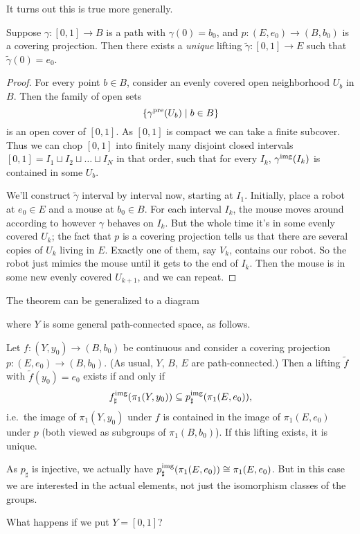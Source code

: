 It turns out this is true more generally.
\begin{theorem}
	Suppose $\gamma \colon [0,1] \to B$ is a path with $\gamma(0) = b_0$, and
	$ p \colon (E,e_0) \to (B,b_0) $
	is a covering projection.
	Then there exists a \emph{unique} lifting $\tilde\gamma \colon [0,1] \to E$
	such that $\tilde\gamma(0) = e_0$.
\end{theorem}
\begin{proof}
	For every point $b \in B$, consider an evenly covered
	open neighborhood $U_b$ in $B$.
	Then the family of open sets
	\[ \left\{ \gamma^{\text{pre}}(U_b) \mid b \in B \right\} \]
	is an open cover of $[0,1]$.
	As $[0,1]$ is compact we can take a finite subcover.
	Thus we can chop $[0,1]$ into finitely many disjoint closed intervals
	$[0,1] = I_1 \sqcup I_2 \sqcup \dots \sqcup I_N$ in that order,
	such that for every $I_k$, $\gamma^{\text{img}}(I_k)$ is contained
	in some $U_b$.

	We'll construct $\tilde\gamma$ interval by interval now,
	starting at $I_1$.
	Initially, place a robot at $e_0 \in E$ and a mouse at $b_0 \in B$.
	For each interval $I_k$, the mouse moves around according
	to however $\gamma$ behaves on $I_k$.
	But the whole time it's in some evenly covered $U_k$;
	the fact that $p$ is a covering projection tells us that
	there are several copies of $U_k$ living in $E$.
	Exactly one of them, say $V_k$, contains our robot.
	So the robot just mimics the mouse until it gets to the end of $I_k$.
	Then the mouse is in some new evenly covered $U_{k+1}$,
	and we can repeat.
\end{proof}

The theorem can be generalized to a diagram
\begin{center}
\end{center}
where $Y$ is some general path-connected space, as follows.
\begin{theorem}
	\label{thm:lifting}
	Let $f \colon (Y,y_0) \to (B, b_0)$ be continuous
	and consider a covering projection $p \colon (E, e_0) \to (B, b_0)$.
	(As usual, $Y$, $B$, $E$ are path-connected.)
	Then a lifting $\tilde f$ with $\tilde f(y_0) = e_0$ exists if and only if
	\[ f_\sharp^{\text{img}}(\pi_1(Y, y_0)) \subseteq p_\sharp^{\text{img}}(\pi_1(E, e_0)), \]
	i.e.\ the image of $\pi_1(Y, y_0)$ under $f$ is contained in
	the image of $\pi_1(E, e_0)$ under $p$ (both viewed as subgroups of $\pi_1(B, b_0)$).
	If this lifting exists, it is unique.
\end{theorem}
As $p_\sharp$ is injective,
we actually have $p_\sharp^{\text{img}}(\pi_1(E, e_0)) \cong \pi_1(E, e_0)$.
But in this case we are interested in the actual elements, not just the isomorphism classes of the groups.
\begin{ques}
	What happens if we put $Y= [0,1]$?
\end{ques}

